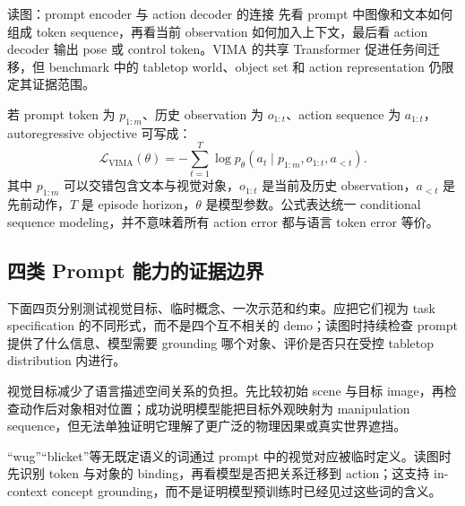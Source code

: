 
\begin{knowledgebox}{读图：prompt encoder 与 action decoder 的连接}
先看 prompt 中图像和文本如何组成 token sequence，再看当前 observation 如何加入上下文，最后看 action decoder 输出 pose 或 control token。VIMA 的共享 Transformer 促进任务间迁移，但 benchmark 中的 tabletop world、object set 和 action representation 仍限定其证据范围。
\end{knowledgebox}

若 prompt token 为 $p_{1:m}$、历史 observation 为 $o_{1:t}$、action sequence 为 $a_{1:t}$，autoregressive objective 可写成：
\[
\mathcal{L}_{\mathrm{VIMA}}(\theta)
=-\sum_{t=1}^{T}\log p_\theta\!\left(a_t\mid p_{1:m},o_{1:t},a_{<t}\right).
\]
其中 $p_{1:m}$ 可以交错包含文本与视觉对象，$o_{1:t}$ 是当前及历史 observation，$a_{<t}$ 是先前动作，$T$ 是 episode horizon，$\theta$ 是模型参数。公式表达统一 conditional sequence modeling，并不意味着所有 action error 都与语言 token error 等价。

\subsection{四类 Prompt 能力的证据边界}

下面四页分别测试视觉目标、临时概念、一次示范和约束。应把它们视为 task specification 的不同形式，而不是四个互不相关的 demo；读图时持续检查 prompt 提供了什么信息、模型需要 grounding 哪个对象、评价是否只在受控 tabletop distribution 内进行。


视觉目标减少了语言描述空间关系的负担。先比较初始 scene 与目标 image，再检查动作后对象相对位置；成功说明模型能把目标外观映射为 manipulation sequence，但无法单独证明它理解了更广泛的物理因果或真实世界遮挡。


“wug”“blicket”等无既定语义的词通过 prompt 中的视觉对应被临时定义。读图时先识别 token 与对象的 binding，再看模型是否把关系迁移到 action；这支持 in-context concept grounding，而不是证明模型预训练时已经见过这些词的含义。



